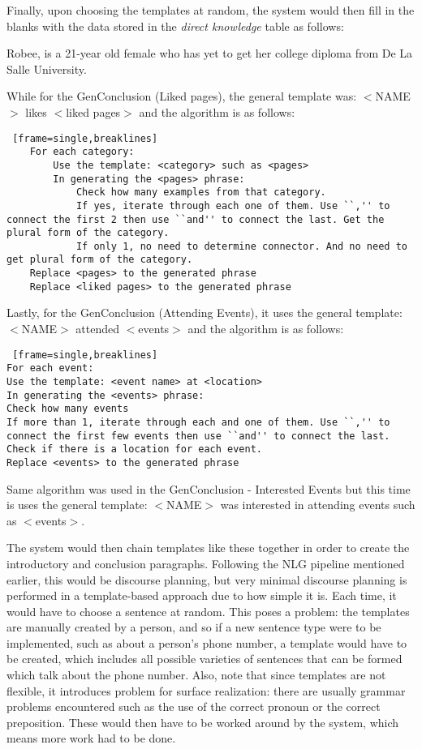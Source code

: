 Finally, upon choosing the templates at random, the system would then fill in the blanks with the data stored in the \textit{direct knowledge} table as follows:

\begin{center} Robee, is a 21-year old female who has yet to get her college diploma from De La Salle University. \end{center}

While for the GenConclusion (Liked pages), the general template was: $<$NAME$>$ likes $<$liked pages$>$ and the algorithm is as follows:
\begin{lstlisting} [frame=single,breaklines]
	For each category:
		Use the template: <category> such as <pages>
		In generating the <pages> phrase:
			Check how many examples from that category.
			If yes, iterate through each one of them. Use ``,'' to connect the first 2 then use ``and'' to connect the last. Get the plural form of the category.
			If only 1, no need to determine connector. And no need to get plural form of the category.
	Replace <pages> to the generated phrase
	Replace <liked pages> to the generated phrase
\end{lstlisting}

Lastly, for the GenConclusion (Attending Events), it uses the general template: $<$NAME$>$ attended $<$events$>$ and the algorithm is as follows:

\begin{lstlisting} [frame=single,breaklines]
For each event:
Use the template: <event name> at <location>
In generating the <events> phrase:
Check how many events
If more than 1, iterate through each and one of them. Use ``,'' to connect the first few events then use ``and'' to connect the last. Check if there is a location for each event.
Replace <events> to the generated phrase
\end{lstlisting}

Same algorithm was used in the GenConclusion - Interested Events but this time is uses the general template: $<$NAME$>$ was interested in attending events such as $<$events$>$.

The system would then chain templates like these together in order to create the introductory and conclusion paragraphs. Following the NLG pipeline mentioned earlier, this would be discourse planning, but very minimal discourse planning is performed in a template-based approach due to how simple it is.  Each time, it would have to choose a sentence at random. This poses a problem: the templates are manually created by a person, and so if a new sentence type were to be implemented, such as about a person's phone number, a template would have to be created, which includes all possible varieties of sentences that can be formed which talk about the phone number. Also, note that since templates are not flexible, it introduces problem for surface realization: there are usually grammar problems encountered such as the use of the correct pronoun or the correct preposition. These would then have to be worked around by the system, which means more work had to be done.

